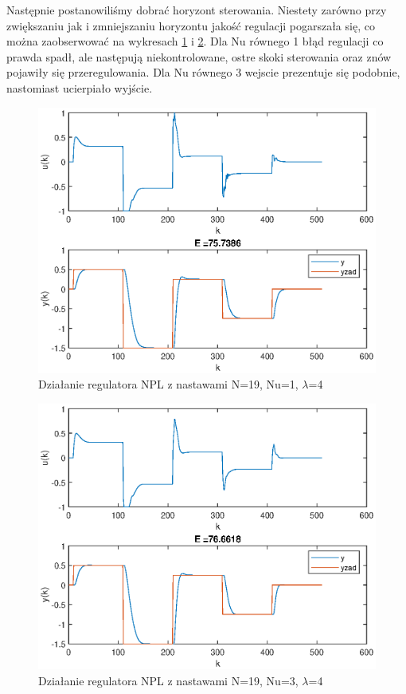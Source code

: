 		\newpage
		Następnie postanowiliśmy dobrać horyzont sterowania. Niestety zarówno przy zwiększaniu jak i zmniejszaniu horyzontu jakość regulacji pogarszała się, co można zaobserwować na wykresach \ref{fig:NPL3} i \ref{fig:NPL4}. Dla Nu równego 1 błąd regulacji co prawda spadł, ale następują niekontrolowane, ostre skoki sterowania oraz znów pojawiły się przeregulowania. Dla Nu równego 3 wejscie prezentuje się podobnie, nastomiast ucierpiało wyjście.
		
		\begin{figure}[h!]
			\centering
			\includegraphics[width=0.7\linewidth]{img/strojenieNPL_N_19_Nu_1_lam_4.eps}
			\caption{Działanie regulatora NPL z nastawami N=19, Nu=1, $\lambda$=4}
			\label{fig:NPL3}
		\end{figure}
		
		\begin{figure}[h!]
			\centering
			\includegraphics[width=0.7\linewidth]{img/strojenieNPL_N_19_Nu_3_lam_4.eps}
			\caption{Działanie regulatora NPL z nastawami N=19, Nu=3, $\lambda$=4}
			\label{fig:NPL4}
		\end{figure}
		
	\newpage	
